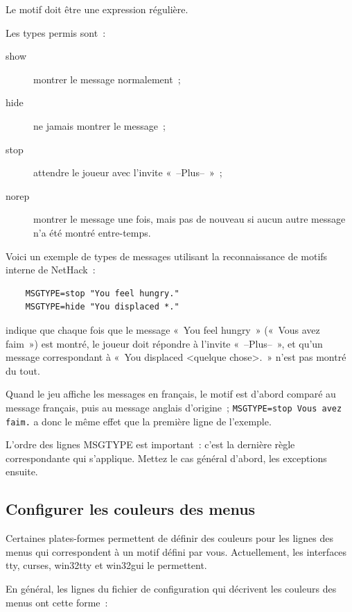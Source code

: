 \documentclass[titlepage]{article}
\begin{document}
Le motif doit être une expression régulière.


Les types permis sont~:
\begin{description}
\item[{show}]
montrer le message normalement~;
\item[{hide}]
ne jamais montrer le message~;
\item[{stop}]
attendre le joueur avec l'invite «~--Plus--~»~;
\item[{norep}]
montrer le message une fois, mais pas de nouveau si aucun autre message
n'a été montré entre-temps.
\end{description}


Voici un exemple de types de messages utilisant la reconnaissance de motifs
interne de NetHack~:
\begin{verbatim}
    MSGTYPE=stop "You feel hungry."
    MSGTYPE=hide "You displaced *."
\end{verbatim}
indique que chaque fois que le message «~You feel hungry~»
(«~Vous avez faim~») est montré, le joueur doit répondre à
l'invite «~--Plus--~», et qu'un message correspondant à
«~You displaced \textless{}quelque chose\textgreater{}.~» n'est pas montré du tout.


Quand le jeu affiche les messages en français, le motif est d'abord
comparé au message français, puis au message anglais d'origine~;
\texttt{MSGTYPE=stop \textquotedbl{}Vous avez faim.\textquotedbl{}} a donc le même effet que la
première ligne de l'exemple.


L'ordre des lignes MSGTYPE est important~: c'est la dernière règle
correspondante qui s'applique.
Mettez le cas général d'abord, les exceptions ensuite.

\subsection{Configurer les couleurs des menus}



Certaines plates-formes permettent de définir des couleurs pour les lignes
des menus qui correspondent à un motif défini par vous.
Actuellement, les interfaces tty, curses, win32tty et win32gui le
permettent.


En général, les lignes du fichier de configuration qui décrivent les
couleurs des menus ont cette forme~:
\end{document}
